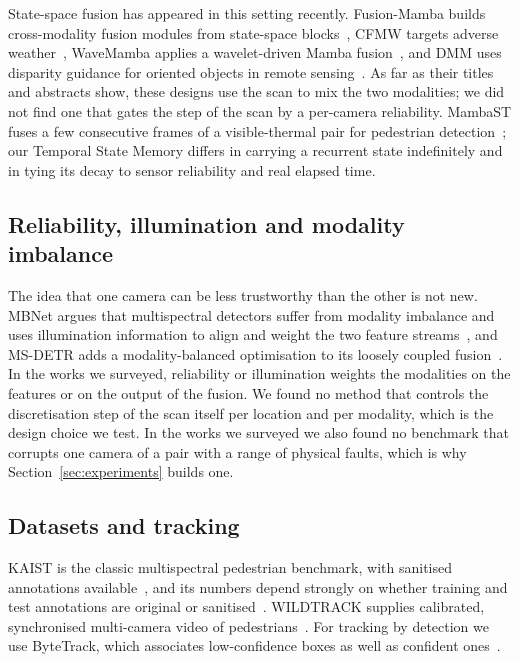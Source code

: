 State-space fusion has appeared in this setting recently. Fusion-Mamba builds cross-modality fusion modules from state-space blocks~\cite{dong2025fusionmamba}, CFMW targets adverse weather~\cite{li2025cfmw}, WaveMamba applies a wavelet-driven Mamba fusion~\cite{zhu2025wavemamba}, and DMM uses disparity guidance for oriented objects in remote sensing~\cite{zhou2024dmm}. As far as their titles and abstracts show, these designs use the scan to mix the two modalities; we did not find one that gates the step of the scan by a per-camera reliability. MambaST fuses a few consecutive frames of a visible-thermal pair for pedestrian detection~\cite{mambast2024}; our Temporal State Memory differs in carrying a recurrent state indefinitely and in tying its decay to sensor reliability and real elapsed time.

\subsection{Reliability, illumination and modality imbalance}
The idea that one camera can be less trustworthy than the other is not new. MBNet argues that multispectral detectors suffer from modality imbalance and uses illumination information to align and weight the two feature streams~\cite{zhou2020mbnet}, and MS-DETR adds a modality-balanced optimisation to its loosely coupled fusion~\cite{xing2024msdetr}. In the works we surveyed, reliability or illumination weights the modalities on the features or on the output of the fusion. We found no method that controls the discretisation step of the scan itself per location and per modality, which is the design choice we test. In the works we surveyed we also found no benchmark that corrupts one camera of a pair with a range of physical faults, which is why Section~\ref{sec:experiments} builds one.

\subsection{Datasets and tracking}
KAIST is the classic multispectral pedestrian benchmark, with sanitised annotations available~\cite{li2018kaistsanitized}, and its numbers depend strongly on whether training and test annotations are original or sanitised~\cite{zhang2021gaff}. WILDTRACK supplies calibrated, synchronised multi-camera video of pedestrians~\cite{chavdarova2018wildtrack}. For tracking by detection we use ByteTrack, which associates low-confidence boxes as well as confident ones~\cite{zhang2022bytetrack}.
